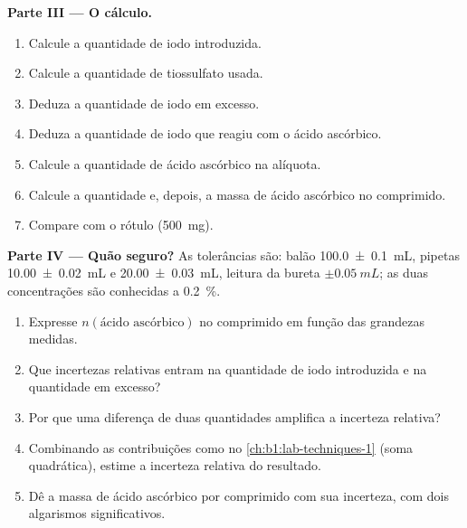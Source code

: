 \begin{problem}
\medskip
\noindent\textbf{Parte III --- O cálculo.}
\begin{enumerate}[resume]
  \item Calcule a quantidade de iodo introduzida.
  \item Calcule a quantidade de tiossulfato usada.
  \item Deduza a quantidade de iodo em excesso.
  \item Deduza a quantidade de iodo que reagiu com o ácido ascórbico.
  \item Calcule a quantidade de ácido ascórbico na alíquota.
  \item Calcule a quantidade e, depois, a massa de ácido ascórbico no
        comprimido.
  \item Compare com o rótulo (\qty{500}{mg}).
\end{enumerate}

\medskip
\noindent\textbf{Parte IV --- Quão seguro?}
As tolerâncias são: balão \qty{100.0 \pm 0.1}{mL}, pipetas
\qty{10.00 \pm 0.02}{mL} e \qty{20.00 \pm 0.03}{mL}, leitura da bureta
$\pm\qty{0.05}{mL}$; as duas concentrações são conhecidas a
\qty{0.2}{\percent}.
\begin{enumerate}[resume]
  \item Expresse $n(\text{ácido ascórbico})$ no comprimido em função das
        grandezas medidas.
  \item Que incertezas relativas entram na quantidade de iodo introduzida
        e na quantidade em excesso?
  \item Por que uma diferença de duas quantidades amplifica a incerteza
        relativa?
  \item Combinando as contribuições como no \cref{ch:b1:lab-techniques-1}
        (soma quadrática), estime a incerteza relativa do resultado.
  \item Dê a massa de ácido ascórbico por comprimido com sua incerteza,
        com dois algarismos significativos.
\end{enumerate}
\end{problem}
